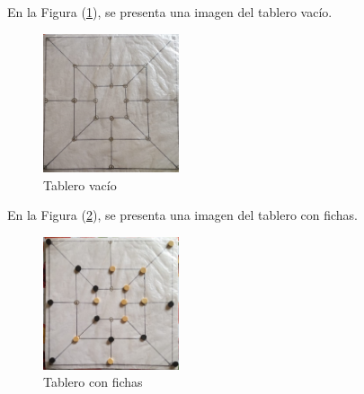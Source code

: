 \documentclass{article}
\begin{document}
En la Figura (\ref{fig:image1}), se presenta una imagen del tablero vacío.

\begin{figure}[h]
\includegraphics[width=4cm]{image1.jpeg}
\centering
\caption{Tablero vacío}
\label{fig:image1}
\end{figure}

En la Figura (\ref{fig:image2}), se presenta una imagen del tablero con fichas.

\begin{figure}[h]
\includegraphics[width=4cm]{image2.jpeg}
\centering
\caption{Tablero con fichas}
\label{fig:image2}
\end{figure}



\end{document}
